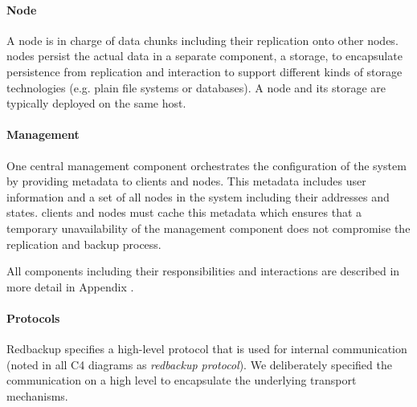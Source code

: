 \paragraph{Node}
A \gls{node} is in charge of data \glspl{chunk} including their replication onto other \glspl{node}. \Glspl{node} persist the actual data in a separate component, a \gls{storage}, to encapsulate persistence from replication and interaction to support different kinds of storage technologies (e.g. plain file systems or databases). A \gls{node} and its \gls{storage} are typically deployed on the same host.

\paragraph{Management}
One central \gls{management} component orchestrates the configuration of the system by providing metadata to \glspl{client} and \glspl{node}. This metadata includes user information and a set of all \glspl{node} in the system including their addresses and states. \Glspl{client} and \glspl{node} must cache this metadata which ensures that a temporary unavailability of the \gls{management} component does not compromise the replication and backup process.

All components including their responsibilities and interactions are described in more detail in Appendix .

\paragraph{Protocols} Redbackup specifies a high-level protocol that is used for internal communication (noted in all C4 diagrams as \emph{redbackup protocol}). We deliberately specified the communication on a high level to encapsulate the underlying transport mechanisms.

